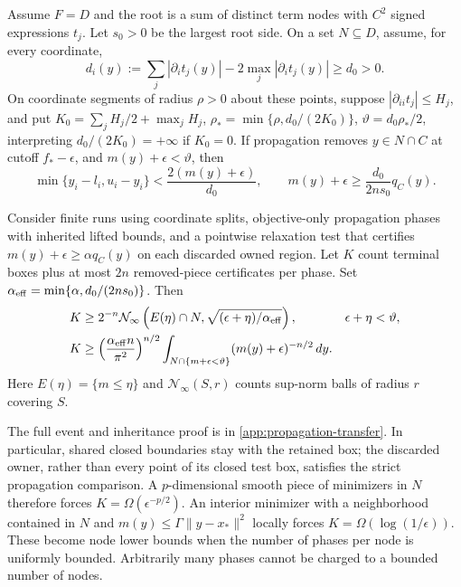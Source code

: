 \begin{theorem}
\label{prop:cnd-transfer}
Assume $F=D$ and the root is a sum of distinct term nodes with $C^2$
signed expressions $t_j$. Let $s_0>0$ be the largest root side. On a set
$N\subseteq D$, assume, for every coordinate,
\[
 d_i(y):=\sum_j|\partial_it_j(y)|-2\max_j|\partial_it_j(y)|\ge d_0>0.
\]
On coordinate segments of radius $\rho>0$ about these points, suppose
$|\partial_{ii}t_j|\le H_j$, and put
$K_0=\sum_jH_j/2+\max_jH_j$,
$\rho_* =\min\{\rho,d_0/(2K_0)\}$,
$\vartheta=d_0\rho_*/2$, interpreting $d_0/(2K_0)=+\infty$ if $K_0=0$.
If propagation removes $y\in N\cap C$ at cutoff $f_* -\epsilon$, and
$m(y)+\epsilon<\vartheta$, then
\begin{equation}
 \min\{y_i-l_i,u_i-y_i\}<\frac{2(m(y)+\epsilon)}{d_0},\qquad
 m(y)+\epsilon\ge\frac{d_0}{2ns_0}q_C(y).
 \label{prop:cnd-validity}
\end{equation}

Consider finite runs using coordinate splits, objective-only propagation
phases with inherited lifted bounds, and a pointwise relaxation test that
certifies $m(y)+\epsilon\ge\alpha q_C(y)$ on each discarded owned region.
Let $K$ count terminal boxes plus at most $2n$ removed-piece certificates
per phase. Set $\alpha_{\rm eff}=\min\{\alpha,d_0/(2ns_0)\}$. Then
\begin{align}
 K&\ge 2^{-n}\mathcal N_\infty\left(E(\eta)\cap N,
                     \sqrt{(\epsilon+\eta)/\alpha_{\rm eff}}\right),
      &&\epsilon+\eta<\vartheta,\label{prop:cnd-cover}\\
 K&\ge\left(\frac{\alpha_{\rm eff}n}{\pi^2}\right)^{n/2}
       \int_{N\cap\{m+\epsilon<\vartheta\}}
             (m(y)+\epsilon)^{-n/2}\,dy.
 \label{prop:cnd-integral}
\end{align}
Here $E(\eta)=\{m\le\eta\}$ and $\mathcal N_\infty(S,r)$ counts
sup-norm balls of radius $r$ covering $S$.
\end{theorem}

The full event and inheritance proof is in
\cref{app:propagation-transfer}. In particular, shared closed boundaries
stay with the retained box; the discarded owner, rather than every point
of its closed test box, satisfies the strict propagation comparison.
A $p$-dimensional smooth piece of minimizers in $N$ therefore forces
$K=\Omega(\epsilon^{-p/2})$. An interior minimizer with a neighborhood
contained in $N$ and
$m(y)\le\Gamma\|y-x_*\|^2$ locally forces
$K=\Omega(\log(1/\epsilon))$. These become node lower bounds when the
number of phases per node is uniformly bounded. Arbitrarily many phases
cannot be charged to a bounded number of nodes.

